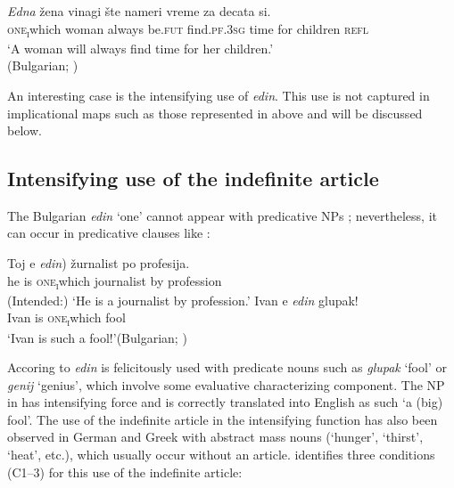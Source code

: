 \documentclass[output=paper,colorlinks,citecolor=brown]{langscibook}
\begin{document}
\ea\label{geist:ex:stereotypes}
\gll \textit{Edna} žena vinagi šte nameri vreme za decata si.\\
 \textsc{one\textsubscript{i}}which woman always be.\textsc{fut} find.\textsc{pf.3sg} time for children \textsc{refl}\\ 
\glt ‘A woman will always find time for her children.’\\\hfill (Bulgarian; \citealt[85]{Gorishneva2011})
\z

\noindent An interesting case is the intensifying use of \textit{edin}. This use is not captured in implicational maps such as those represented in  above and will be discussed below.

\subsection{Intensifying use of the indefinite article}\label{geist:sec:5.2}

The Bulgarian \textit{edin} ‘one’ cannot appear with predicative NPs ; nevertheless, it can occur in predicative clauses like :

\ea
\ea\label{geist:ex:intens-a}
\gll Toj e \minsp{(*} \textit{edin}) žurnalist po profesija.\\
he is {} \textsc{one\textsubscript{i}}which journalist by profession\\
\glt (Intended:) ‘He is a journalist by profession.’
\ex\label{geist:ex:intens-b}
\gll Ivan e \textit{edin} glupak!\\
Ivan is \textsc{one\textsubscript{i}}which fool\\
\glt ‘Ivan is such a fool!’\hfill (Bulgarian; \citealt{Ivanova.Koval1994})
\z\z

\noindent Accoring to \citet{Ivanova.Koval1994} \textit{edin} is felicitously used with predicate nouns such as \textit{glupak} ‘fool’ or \textit{genij} ‘genius’, which involve some evaluative characterizing component. The NP in  has intensifying force and is correctly translated into English as such `a (big) fool'. The use of the indefinite article in the intensifying function has also been observed in German and Greek with abstract mass nouns (`hunger', `thirst', `heat', etc.), which usually occur without an article. \citet{Gorishneva2009} identifies three conditions (C1--3) for this use of the indefinite article:
\end{document}
